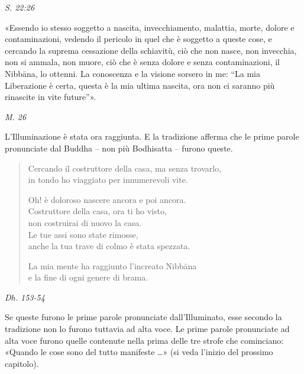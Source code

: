 \emph{S. 22:26}


«Essendo io stesso soggetto a nascita, invecchiamento, malattia, morte,
dolore e contaminazioni, vedendo il pericolo in quel che è soggetto a
queste cose, e cercando la suprema cessazione della schiavitù, ciò che
non nasce, non invecchia, non si ammala, non muore, ciò che è senza
dolore e senza contaminazioni, il Nibbāna, lo ottenni. La conoscenza e
la visione sorsero in me: “La mia Liberazione è certa, questa è la mia
ultima nascita, ora non ci saranno più rinascite in vite future”».


\emph{M. 26}


 L’Illuminazione è stata ora raggiunta. E la
tradizione afferma che le prime parole pronunciate dal Buddha – non più
Bodhisatta – furono queste.


\begin{quote}


Cercando il costruttore della casa, ma senza trovarlo, \\
in tondo ho viaggiato per innumerevoli vite.


Oh! è doloroso nascere ancora e poi ancora. \\
Costruttore della casa, ora ti ho visto, \\
non costruirai di nuovo la casa. \\
Le tue assi sono state rimosse, \\
anche la tua trave di colmo è stata spezzata.


La mia mente ha raggiunto l’increato Nibbāna \\
e la fine di ogni genere di brama.
\end{quote}

\emph{Dh. 153-54}


 Se queste furono le prime parole pronunciate
dall’Illuminato, esse secondo la tradizione non lo furono tuttavia ad
alta voce. Le prime parole pronunciate ad alta voce furono quelle
contenute nella prima delle tre strofe che cominciano: «Quando le cose
sono del tutto manifeste …​» (si veda l’inizio del prossimo capitolo).


